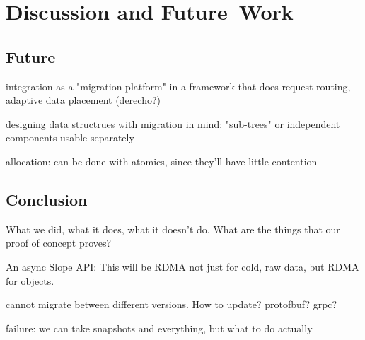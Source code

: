 \chapter{Discussion and Future~Work}
\label{chap:discussionfuture}


\section{Future}

integration as a "migration platform" in a framework that does request routing,
adaptive data placement (derecho?)

designing data structrues with migration in mind: "sub-trees" or independent
components usable separately

allocation: can be done with atomics, since they'll have little contention


\section{Conclusion}
What we did, what it does, \cite{kalia2016fasst} what it doesn't do. What are the things that our
proof of concept proves?

An async Slope API: This will be RDMA not just for cold, raw data, but RDMA for
objects.

cannot migrate between different versions. How to update? protofbuf? grpc?


failure: we can take snapshots and everything, but what to do actually
